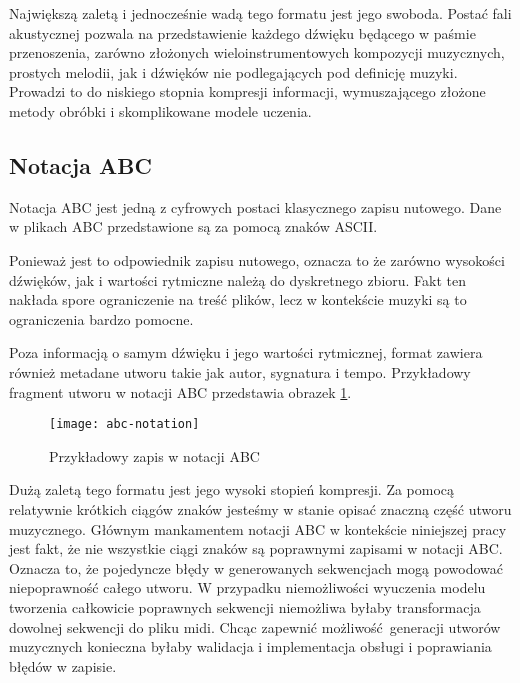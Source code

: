 {{{            Największą zaletą i jednocześnie wadą tego formatu jest jego swoboda. 
            Postać fali akustycznej pozwala na przedstawienie każdego dźwięku będącego w paśmie
            przenoszenia, zarówno złożonych wieloinstrumentowych kompozycji muzycznych, 
            prostych melodii, jak i dźwięków nie podlegających pod definicję muzyki. 
            Prowadzi to do niskiego stopnia kompresji informacji, wymuszającego złożone metody obróbki i skomplikowane
            modele uczenia.
        }

        \subsection{Notacja ABC}
        {
            Notacja ABC jest jedną z cyfrowych postaci klasycznego zapisu nutowego.
            Dane w plikach ABC przedstawione są za pomocą znaków ASCII.

            Ponieważ jest to odpowiednik zapisu nutowego, oznacza to
            że zarówno wysokości dźwięków, jak i wartości rytmiczne należą do dyskretnego zbioru.
            Fakt ten nakłada spore ograniczenie na treść plików, lecz w kontekście muzyki są to 
            ograniczenia bardzo pomocne.

            Poza informacją o samym dźwięku i jego wartości rytmicznej, format zawiera również metadane
            utworu takie jak autor, sygnatura i tempo. Przykładowy fragment utworu w notacji ABC przedstawia
            obrazek \ref{abcnotation}.

            \begin{figure}
                \centering
                \texttt{[image: abc-notation]}
                \caption{Przykładowy zapis w notacji ABC}
                \label{abcnotation}
            \end{figure}

            Dużą zaletą tego formatu jest jego wysoki stopień kompresji. Za pomocą relatywnie krótkich ciągów
            znaków jesteśmy w stanie opisać znaczną część utworu muzycznego. Głównym mankamentem notacji ABC
            w kontekście niniejszej pracy jest fakt, że nie wszystkie ciągi znaków są poprawnymi zapisami 
            w notacji ABC. Oznacza to, że pojedyncze błędy w generowanych sekwencjach mogą powodować niepoprawność całego utworu.
            W przypadku niemożliwości wyuczenia modelu tworzenia całkowicie poprawnych sekwencji niemożliwa byłaby
            transformacja dowolnej sekwencji do pliku midi. Chcąc zapewnić możliwość generacji utworów muzycznych
            konieczna byłaby walidacja i implementacja obsługi i poprawiania błędów w zapisie.
        }

}}
